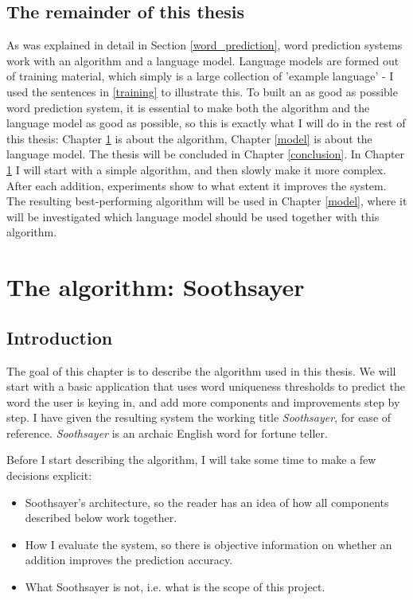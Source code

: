 \documentclass[11pt]{article}
\begin{document}
\subsection{The remainder of this thesis} \label{restofthisthesis}
As was explained in detail in Section \ref{word_prediction}, word prediction systems work with an algorithm and a language model. Language models are formed out of training material, which simply is a large collection of 'example language' - I used the sentences in \ref{training} to illustrate this. To built an as good as possible word prediction system, it is essential to make both the algorithm and the language model as good as possible, so this is exactly what I will do in the rest of this thesis: Chapter \ref{algorithm} is about the algorithm, Chapter \ref{model} is about the language model. The thesis will be concluded in Chapter \ref{conclusion}. In Chapter \ref{algorithm} I will start with a simple algorithm, and then slowly make it more complex. After each addition, experiments show to what extent it improves the system. The resulting best-performing algorithm will be used in Chapter \ref{model}, where it will be investigated which language model should be used together with this algorithm. 





\section{The algorithm: Soothsayer} \label{algorithm}

\subsection{Introduction}

The goal of this chapter is to describe the algorithm used in this thesis. We will start with a basic application that uses word uniqueness thresholds to predict the word the user is keying in, and add more components and improvements step by step. I have given the resulting system the working title \emph{Soothsayer}, for ease of reference. \emph{Soothsayer} is an archaic English word for fortune teller.

Before I start describing the algorithm, I will take some time to make a few decisions explicit: 

\begin{itemize}
\item Soothsayer's architecture, so the reader has an idea of how all components described below work together.
\item How I evaluate the system, so there is objective information on whether an addition improves the prediction accuracy.
\item What Soothsayer is not, i.e. what is the scope of this project.
\end{itemize}
\end{document}
